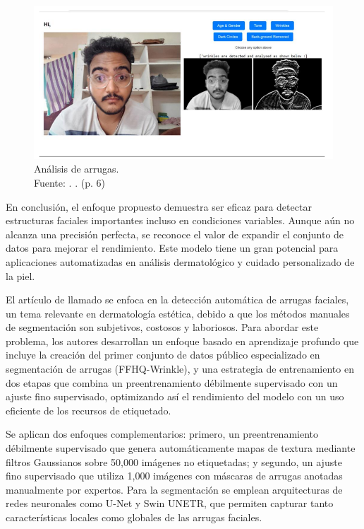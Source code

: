 \begin{figure}[!ht]
	\begin{center}
		\includegraphics[width=1\textwidth]{2/figures/softres3.png}
		\caption[Análisis de arrugas]{Análisis de arrugas.\\
			Fuente: \cite{Tamilkodi2024}. . (p. 6)}
		\label{2:fig10}
	\end{center}
\end{figure}

En conclusión, el enfoque propuesto demuestra ser eficaz para detectar estructuras faciales importantes incluso en condiciones variables. Aunque aún no alcanza una precisión perfecta, se reconoce el valor de expandir el conjunto de datos para mejorar el rendimiento. Este modelo tiene un gran potencial para aplicaciones automatizadas en análisis dermatológico y cuidado personalizado de la piel.

El artículo de \cite{moon2024dermatology} llamado  se enfoca en la detección automática de arrugas faciales, un tema relevante en dermatología estética, debido a que los métodos manuales de segmentación son subjetivos, costosos y laboriosos. Para abordar este problema, los autores desarrollan un enfoque basado en aprendizaje profundo que incluye la creación del primer conjunto de datos público especializado en segmentación de arrugas (FFHQ-Wrinkle), y una estrategia de entrenamiento en dos etapas que combina un preentrenamiento débilmente supervisado con un ajuste fino supervisado, optimizando así el rendimiento del modelo con un uso eficiente de los recursos de etiquetado.

Se aplican dos enfoques complementarios: primero, un preentrenamiento débilmente supervisado que genera automáticamente mapas de textura mediante filtros Gaussianos sobre 50,000 imágenes no etiquetadas; y segundo, un ajuste fino supervisado que utiliza 1,000 imágenes con máscaras de arrugas anotadas manualmente por expertos. Para la segmentación se emplean arquitecturas de redes neuronales como U-Net y Swin UNETR, que permiten capturar tanto características locales como globales de las arrugas faciales.

